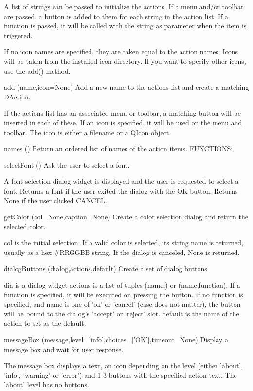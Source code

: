         A list of strings can be passed to initialize the actions.
        If a menu and/or toolbar are passed, a button is added to them
        for each string in the action list.
        If a function is passed, it will be called with the string as
        parameter when the item is triggered.

        If no icon names are specified, they are taken equal to the
        action names. Icons will be taken from the installed icon directory.
        If you want to specify other icons, use the add() method.
        

add (name,icon=None)
Add a new name to the actions list and create a matching DAction.

        If the actions list has an associated menu or toolbar,
        a matching button will be inserted in each of these.
        If an icon is specified, it will be used on the menu and toolbar.
        The icon is either a filename or a QIcon object. 
        

names ()
Return an ordered list of names of the action items.
FUNCTIONS:

selectFont ()
Ask the user to select a font.

    A font selection dialog widget is displayed and the user is requested
    to select a font.
    Returns a font if the user exited the dialog with the OK button.
    Returns None if the user clicked CANCEL.
    

getColor (col=None,caption=None)
Create a color selection dialog and return the selected color.

    col is the initial selection.
    If a valid color is selected, its string name is returned, usually as
    a hex \#RRGGBB string. If the dialog is canceled, None is returned.
    

dialogButtons (dialog,actions,default)
Create a set of dialog buttons

    dia is a dialog widget
    actions is a list of tuples (name,) or (name,function).
    If a function is specified, it will be executed on pressing the button.
    If no function is specified, and name is one of 'ok' or 'cancel' (case
    does not matter), the button will be bound to the dialog's 'accept'
    or 'reject' slot.
    default is the name of the action to set as the default.
    

messageBox (message,level='info',choices=['OK'],timeout=None)
Display a message box and wait for user response.

    The message box displays a text, an icon depending on the level
    (either 'about', 'info', 'warning' or 'error') and 1-3 buttons
    with the specified action text. The 'about' level has no buttons.

